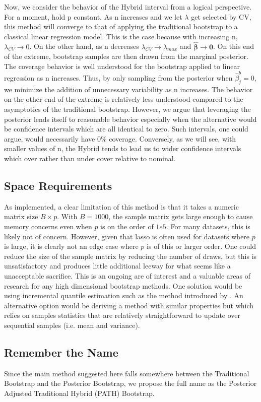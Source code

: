 Now, we consider the behavior of the Hybrid interval from a logical perspective. For a moment, hold p constant. As n increases and we let $\lambda$ get selected by CV, this method will converge to that of applying the traditional bootstrap to a classical linear regression model. This is the case because with increasing n, $\lambda_{CV} \rightarrow 0$. On the other hand, as n decreases $\lambda_{CV} \rightarrow \lambda_{max}$ and $\hat{\boldsymbol{\beta}}\rightarrow \boldsymbol{0}$. On this end of the extreme, bootstrap samples are then drawn from the marginal posterior. The coverage behavior is well understood for the bootstrap applied to linear regression as n increases. Thus, by only sampling from the posterior when $\hat{\beta}_j^b = 0$, we minimize the addition of unnecessary variability as n increases. The behavior on the other end of the extreme is relatively less understood compared to the asymptotics of the traditional bootstrap. However, we argue that leveraging the posterior lends itself to reasonable behavior especially when the alternative would be confidence intervals which are all identical to zero. Such intervals, one could argue, would necessarily have 0\% coverage. Conversely, as we will see, with smaller values of n, the Hybrid tends to lead us to wider confidence intervals which over rather than under cover relative to nominal.

\subsection{Space Requirements}

As implemented, a clear limitation of this method is that it takes a numeric matrix size $B \times p$. With $B = 1000$, the sample matrix gets large enough to cause memory concerns even when $p$ is on the order of $1e5$. For many datasets, this is likely not of concern. However, given that lasso is often used for datasets where $p$ is large, it is clearly not an edge case where $p$ is of this or larger order. One could reduce the size of the sample matrix by reducing the number of draws, but this is unsatisfactory and produces little additional leeway for what seems like a unacceptable sacrifice. This is an ongoing are of interest and a valuable areas of research for any high dimensional bootstrap methods. One solution would be using incremental quantile estimation such as the method introduced by \cite{Tierney1983}. An alternative option would be deriving a method with similar properties but which relies on samples statistics that are relatively straightforward to update over sequential samples (i.e. mean and variance).

\subsection{Remember the Name}

Since the main method suggested here falls somewhere between the Traditional Bootstrap and the Posterior Bootstrap, we propose the full name as the Posterior Adjusted Traditional Hybrid (PATH) Bootstrap.
